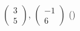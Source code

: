 $\begin{pmatrix} 3 \\ 5 \end{pmatrix}$, $\begin{pmatrix} -1 \\ 6 \end{pmatrix}$ \hfill (\hspace*{2.4em})
